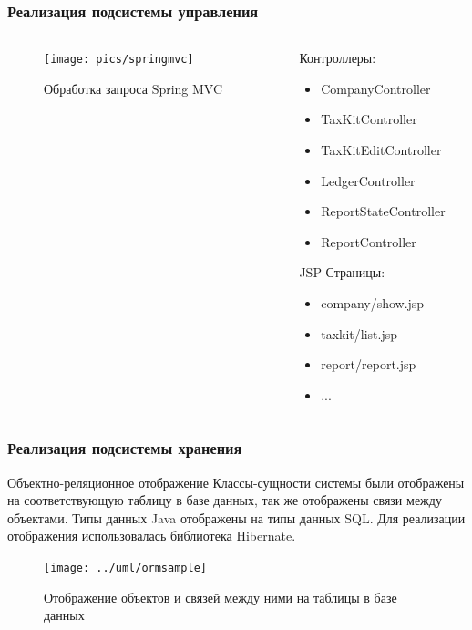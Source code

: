\documentclass[xcolor=pdftex, dvipsnames, table]{beamer}
\begin{document}
\begin{frame}
  \frametitle{Реализация подсистемы управления}
  \begin{columns}
    \begin{column}{0.6\textwidth}
      \begin{center}
        \begin{figure}
          \texttt{[image: pics/springmvc]}
          \caption{Обработка запроса Spring MVC}
          \label{pic:springmvc}
        \end{figure}
      \end{center}
    \end{column}
    \begin{column}{0.5\textwidth}
      Контроллеры:
      \begin{itemize}
        \item CompanyController
        \item TaxKitController
        \item TaxKitEditController
        \item LedgerController
        \item ReportStateController
        \item ReportController
      \end{itemize}
      JSP Страницы:
      \begin{itemize}
        \item company/show.jsp
        \item taxkit/list.jsp
        \item report/report.jsp
        \item ...
      \end{itemize}
    \end{column}
  \end{columns}
\end{frame}

\begin{frame}
  \frametitle{Реализация подсистемы хранения}
  \begin{block}{Объектно-реляционное отображение}
    Классы-сущности системы были отображены на соответствующую таблицу в базе данных, так же отображены связи между объектами. Типы данных Java отображены на типы данных SQL. Для реализации отображения использовалась библиотека Hibernate.
  \end{block}
  \begin{figure}
    \texttt{[image: ../uml/ormsample]}
    \caption{Отображение объектов и связей между ними на таблицы в базе данных}
  \end{figure}
\end{frame}
\end{document}
